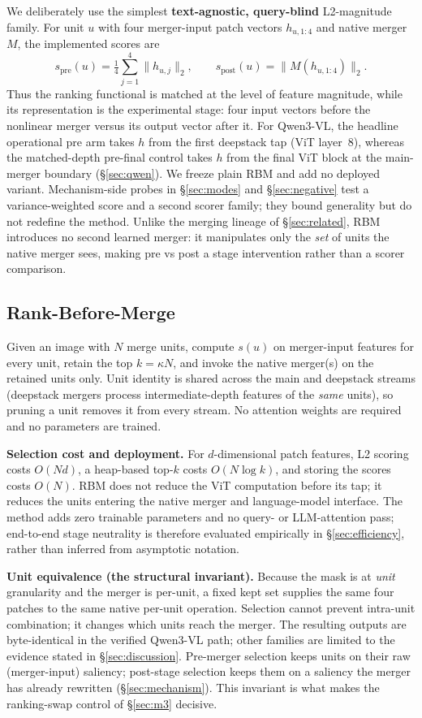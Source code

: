 \documentclass[journal]{IEEEtran}
\begin{document}
We deliberately use the simplest \textbf{text-agnostic, query-blind}
L2-magnitude family. For unit $u$ with four merger-input patch vectors
$h_{u,1:4}$ and native merger $M$, the implemented scores are
\[
s_{\mathrm{pre}}(u)=\tfrac14\sum_{j=1}^{4}\|h_{u,j}\|_2,
\qquad
s_{\mathrm{post}}(u)=\|M(h_{u,1:4})\|_2.
\]
Thus the ranking functional is matched at the level of feature magnitude,
while its representation is the experimental stage: four input vectors before
the nonlinear merger versus its output vector after it. For Qwen3-VL, the
headline operational pre arm takes $h$ from the first deepstack tap (ViT
layer~8), whereas the matched-depth pre-final control takes $h$ from the final
ViT block at the main-merger boundary (\S\ref{sec:qwen}). We freeze plain RBM
and add no deployed variant. Mechanism-side probes in \S\ref{sec:modes} and
\S\ref{sec:negative} test a variance-weighted score and a second scorer family;
they bound generality but do not redefine the method. Unlike the merging lineage
of \S\ref{sec:related}, RBM introduces no second learned merger: it manipulates
only the \emph{set} of units the native merger sees, making pre vs post a stage
intervention rather than a scorer comparison.

\subsection{Rank-Before-Merge}\label{sec:rbm}

Given an image with $N$ merge units, compute $s(u)$ on merger-input features for
every unit, retain the top $k = \kappa N$, and invoke the native merger(s) on
the retained units only. Unit identity is shared across the main and deepstack
streams (deepstack mergers process intermediate-depth features of the
\emph{same} units), so pruning a unit removes it from every stream. No attention
weights are required and no parameters are trained.

\textbf{Selection cost and deployment.} For $d$-dimensional patch features,
L2 scoring costs $O(Nd)$, a heap-based top-$k$ costs $O(N\log k)$, and storing
the scores costs $O(N)$. RBM does not reduce the ViT computation before its tap;
it reduces the units entering the native merger and language-model interface.
The method adds zero trainable parameters and no query- or LLM-attention pass;
end-to-end stage neutrality is therefore evaluated empirically in
\S\ref{sec:efficiency}, rather than inferred from asymptotic notation.

\textbf{Unit equivalence (the structural invariant).} Because the mask is at
\emph{unit} granularity and the merger is per-unit, a fixed kept set supplies
the same four patches to the same native per-unit operation. Selection cannot
prevent intra-unit combination; it changes which units reach the merger. The
resulting outputs are byte-identical in the verified Qwen3-VL path; other
families are limited to the evidence stated in \S\ref{sec:discussion}. Pre-merger
selection keeps units on their raw (merger-input) saliency; post-stage selection
keeps them on a saliency the merger has already rewritten (\S\ref{sec:mechanism}).
This invariant is what makes the ranking-swap control of \S\ref{sec:m3}
decisive.
\end{document}
